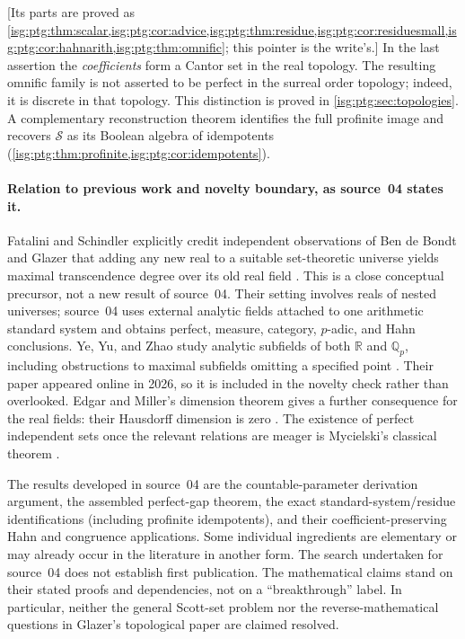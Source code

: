 \documentclass[11pt]{article}
\theoremstyle{definition}
\theoremstyle{remark}
\newcommand{\R}{\mathbb{R}}
\newcommand{\Qp}{\mathbb{Q}_p}
\begin{document}
\textup{[}Its parts are proved as
\cref{isg:ptg:thm:scalar,isg:ptg:cor:advice,isg:ptg:thm:residue,isg:ptg:cor:residuesmall,isg:ptg:cor:hahnarith,isg:ptg:thm:omnific};
this pointer is the write's.\textup{]} In the last assertion the \emph{coefficients} form a Cantor set in the real
topology. The resulting omnific family is not asserted to be perfect in the
surreal order topology; indeed, it is discrete in that topology. This
distinction is proved in \cref{isg:ptg:sec:topologies}. A complementary
reconstruction theorem identifies the full profinite image and recovers
$\mathcal S$ as its Boolean algebra of idempotents
(\cref{isg:ptg:thm:profinite,isg:ptg:cor:idempotents}).

\paragraph{Relation to previous work and novelty boundary, as source~04
states it.} Fatalini and Schindler explicitly credit independent
observations of Ben de Bondt and Glazer that adding any new real to a
suitable set-theoretic universe yields maximal transcendence degree over
its old real field \cite[Section~2]{FataliniSchindler}. This is a close
conceptual precursor, not a new result of source~04. Their setting involves
reals of nested universes; source~04 uses external analytic fields attached
to one arithmetic standard system and obtains perfect, measure, category,
$p$-adic, and Hahn conclusions. Ye, Yu, and Zhao study analytic subfields
of both $\R$ and $\Qp$, including obstructions to maximal subfields
omitting a specified point \cite[Proposition~2.6]{YeYuZhao}. Their paper
appeared online in 2026, so it is included in the novelty check rather than
overlooked. Edgar and Miller's dimension theorem gives a further
consequence for the real fields: their Hausdorff dimension is zero
\cite{EdgarMiller}. The existence of perfect independent sets once the
relevant relations are meager is Mycielski's classical theorem
\cite{Mycielski,DolezalKubis}.

The results developed in source~04 are the countable-parameter derivation
argument, the assembled perfect-gap theorem, the exact
standard-system/residue identifications (including profinite idempotents),
and their coefficient-preserving Hahn and congruence applications. Some
individual ingredients are elementary or may already occur in the
literature in another form. The search undertaken for source~04 does not
establish first publication. The mathematical claims stand on their stated
proofs and dependencies, not on a ``breakthrough'' label. In particular,
neither the general Scott-set problem nor the reverse-mathematical questions
in Glazer's topological paper are claimed resolved.
\end{document}

